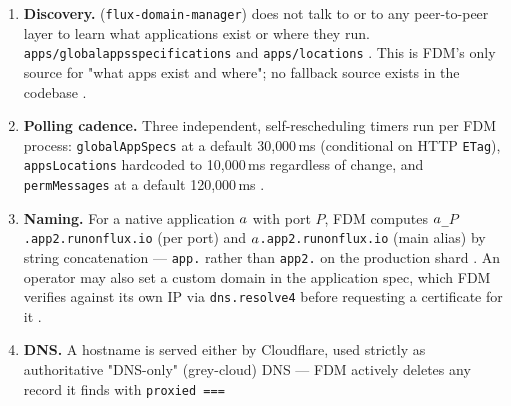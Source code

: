 \begin{enumerate}
  \item \textbf{Discovery.} \FDM (\texttt{flux-\allowbreak{}domain-\allowbreak{}manager}) does not talk to \fluxd or to any
  peer-to-peer layer to learn what applications exist or where they run. 
  \texttt{apps/\allowbreak{}globalappsspecifications} and \texttt{apps/locations}
  . This is FDM's only
  source for "what apps exist and where"; no fallback source exists in the codebase
  .
  \item \textbf{Polling cadence.} Three independent, self-rescheduling timers run per FDM process:
  \texttt{globalAppSpecs} at a default 30{,}000\,ms (conditional on HTTP \texttt{ETag}), \texttt{
  apps\allowbreak{}Locations} hardcoded to 10{,}000\,ms regardless of change, and \texttt{permMessages} at a
  default 120{,}000\,ms .
  \item \textbf{Naming.} For a native application $a$ with port $P$, FDM computes
  \texttt{$a$\_$P$.app2.runonflux.io} (per port) and \texttt{$a$.app2.runonflux.io} (main
  alias) by string concatenation — \texttt{app.} rather than \texttt{app2.} on the production
  shard . An operator may also
  set a custom domain in the application spec, which FDM verifies against its own IP via
  \texttt{dns.resolve4} before requesting a certificate for it
  .
  \item \textbf{DNS.} A hostname is served either by Cloudflare, used strictly as authoritative
  "DNS-only" (grey-cloud) DNS — FDM actively deletes any record it finds with \texttt{proxied =\allowbreak{}=\allowbreak{}=\allowbreak{}
}
\end{enumerate}
